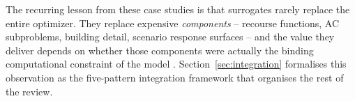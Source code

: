 The recurring lesson from these case studies is that surrogates
rarely replace the entire optimizer. They replace expensive
\emph{components} -- recourse functions, AC subproblems, building
detail, scenario response surfaces -- and the value they deliver
depends on whether those components were actually the binding
computational constraint of the model
\cite{Ruan2021221,Khaloie2025,Lim2025,Mylonopoulos202332697,Starke2025214}.
Section~\ref{sec:integration} formalises this observation as the
five-pattern integration framework that organises the rest of the
review.
